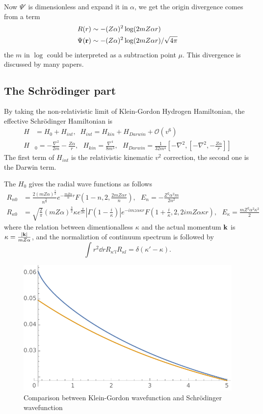 \documentclass[aps,prd,preprint,showkeys,10pt]{revtex4-1}
\newcommand{\vbk}{\vb{k}}
\renewcommand{\a}{\alpha}
\newcommand{\ka}{\kappa}
\begin{document}
Now $\Psi '$ is dimensionless and expand it in $\alpha$, we get the origin divergence comes from a term
\begin{align}
	R(r)&\sim-(Z\alpha)^2\log(2m Z \a r)\\
	\Psi(\vb{r})&\sim-(Z\alpha)^2\log(2m Z \a r)/\sqrt{4\pi}
\end{align}
the $m$ in $\log$ could be interpreted as a subtraction point $\mu$. This divergence is discussed by many papers\cite{Chen2007,Chen2009}.

\subsection{The Schr\"odinger part}

By taking the non-relativistic limit of Klein-Gordon Hydrogen Hamiltonian, the effective Schr\"odinger Hamiltonian is\cite{Holstein2014}
\begin{align}
	H & =H_0+H_{int} ,\;\;H_{int}=H_{kin}+H_{Darwin}+\mathcal{O}(v^6)                                                                                                                           \\
	H & _0=-\frac{\nabla^2}{2m}-\frac{Z\alpha}{r},\ \ \ H_{kin}=\frac{\nabla^4}{8m^3},\ \ \ H_{Darwin}=\frac{1}{32m^4}[-\nabla^2,[-\nabla^2,-\frac{Z\alpha}{r}]]
\end{align}
The first term of $H_{int}$ is the relativistic kinematic $v^2$ correction, the second one is the Darwin term.

The $H_0$ gives the radial wave functions as follows
\begin{align}
	R_{n0}       & =\frac{2(mZ\alpha)^\frac{3}{2}}{n^\frac{3}{2}}e^{-\frac{mZ\alpha}{n}r}F(1-n,2,\frac{2mZ\alpha r}{n}),\ \ \ E_n=-\frac{Z^2\alpha^2m}{2n^2}                                                                             \\
	R_{\kappa 0} & =\sqrt{\frac{2}{\pi}}(mZ\alpha)^\frac{3}{2}\kappa e^\frac{\pi}{2\kappa}|\Gamma(1-\frac{i}{\kappa})|e^{-imz\alpha \kappa r}F(1+\frac{i}{\kappa},2,2imZ\alpha \kappa r),\ \ \ E_{\kappa}=\frac{mZ^2\alpha^2\kappa^2}{2}
\end{align}
where the relation between dimentionalless $\ka$ and the actual momentum $\vbk$ is $\kappa=\frac{\abs{\vbk}}{m Z \a}$, and the normaliztion of continuum spectrum is followed by $$\int r^2\dd rR_{\ka' l}R_{\ka l}=\delta(\ka'-\ka).$$
\begin{figure}
	\centering
	\includegraphics[width=4 in]{QM-KG-1.pdf}
	\caption{Comparison between Klein-Gordon wavefunction and Schr\"odinger wavefunction}
\end{figure}
\end{document}
